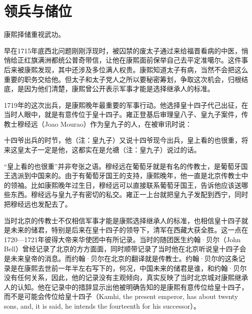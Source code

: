 \section{领兵与储位}

\begin{law}\label{thm:kxopinion}
康熙择储重视武功。
\end{law}


早在1715年底西北问题刚刚浮现时，被囚禁的废太子通过来给福晋看病的中医，悄悄给正红旗满洲都统公普奇带信，让他在康熙面前保举自己去平定准噶尔。这件事后来被康熙发现，其中还涉及多位满人权贵。康熙知道太子有病，当然不会把这么重要的职务交给他。但太子和太子党人之所以要秘密筹划，争取这次机会，归根结底，是因为他们清楚，康熙曾公开表示军事才能是选择继承人的标准。



1719年的这次出兵，是康熙晚年最重要的军事行动。他选择皇十四子代己出征，在当时人眼中，就是有意传位于皇十四子。雍正登基后审理皇八子、皇九子案件，传教士穆经远（Joao Mourao）作为皇九子的人，在被审讯时说：



\begin{bookquote}十四爷出兵的时节，他（注：皇九子）又说十四爷现今出兵，皇上看的也很重，将来这皇太子一定是他，这都实在是允禟（注：皇九子）说过的话。\end{bookquote}


“皇上看的也很重”并非夸张之语。穆经远在葡萄牙就是有名的传教士，是葡萄牙国王选派到中国来的。由于有葡萄牙国王的支持，康熙晚年，他一直是北京传教士中的领袖。比如康熙晚年过生日，穆经远可以直接联系葡萄牙国王，告诉他应该送哪些东西。穆经远与皇九子有密切的私交。雍正一上台就把皇九子发配到西宁，同时把穆经远也发配去了。



当时北京的传教士不仅相信军事才能是康熙选择继承人的标准，也相信皇十四子就是未来的储君，特别是后来在皇十四子的领导下，清军在西藏大获全胜。这一点在1720—1721年彼得大帝来华使团中有所记录。当时的随团医生约翰·贝尔（John Bell）曾经记录了北京的方方面面，同时顺带记录了当时他在北京听说皇十四子会是未来皇帝的消息。而约翰·贝尔在北京的翻译就是传教士。约翰·贝尔的这条记录是在康熙去世前一年半左右写下的，何况，中国未来的储君是谁，和约翰·贝尔没有任何关系，因此，他的记录没有主观倾向，真实反映了当时北京城对康熙继承人的认知。他在记录中的措辞显示出他被明确告知的是康熙有意传位给皇十四子，而不是可能会传位给皇十四子（Kamhi, the present emperor, has about twenty sons, and, it is said, he intends the fourteenth for his successor）。


